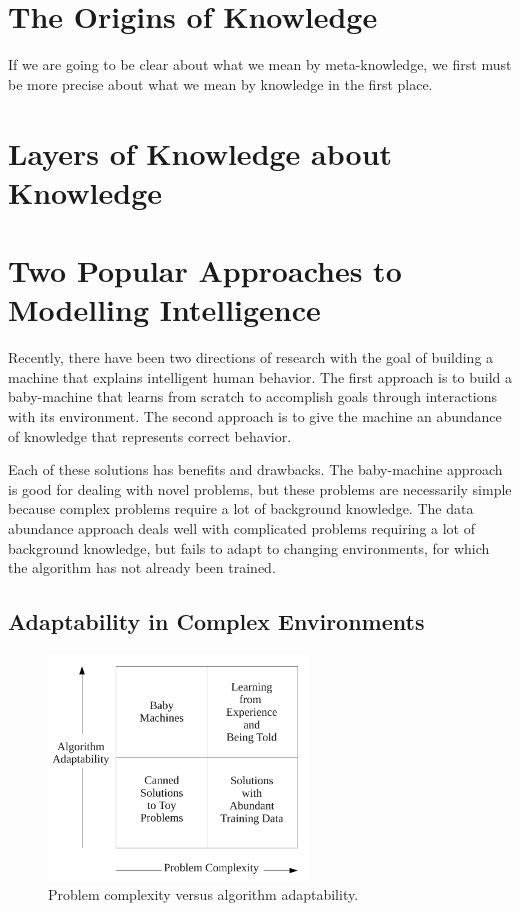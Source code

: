 \section{The Origins of Knowledge}

If we are going to be clear about what we mean by meta-knowledge, we
first must be more precise about what we mean by knowledge in the
first place.


\section{Layers of Knowledge about Knowledge}




\section{Two Popular Approaches to Modelling Intelligence}

Recently, there have been two directions of research with the goal of
building a machine that explains intelligent human behavior.  The
first approach is to build a baby-machine that learns from scratch to
accomplish goals through interactions with its environment.  The
second approach is to give the machine an abundance of knowledge that
represents correct behavior.

Each of these solutions has benefits and drawbacks.  The baby-machine
approach is good for dealing with novel problems, but these problems
are necessarily simple because complex problems require a lot of
background knowledge.  The data abundance approach deals well with
complicated problems requiring a lot of background knowledge, but
fails to adapt to changing environments, for which the algorithm has
not already been trained.

\subsection{Adaptability in Complex Environments}

\begin{figure}[bth]
  \center
  \includegraphics[height=6cm]{gfx/problem_complexity_versus_algorithm_adaptability}
  \caption[Problem complexity versus algorithm adaptability]{Problem
    complexity versus algorithm adaptability.}
  \label{fig:problem_complexity_versus_algorithm_adaptability}
\end{figure}

